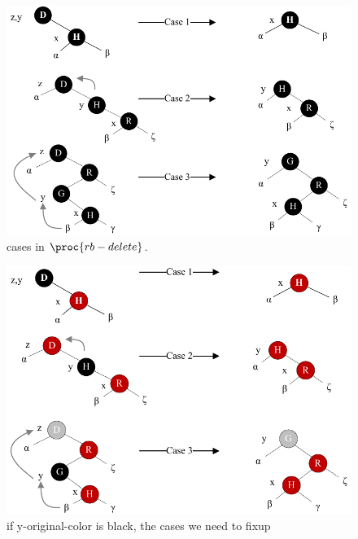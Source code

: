 \documentclass[UTF8,11pt,openany]{ctexbook}
\begin{document}
\begin{figure}[h] %
	\centering %
	\includegraphics[width=1\textwidth]{vector/red-black-tree/delete/delete_cases.pdf} %
	\caption{ cases in $ \proc{rb-delete}  $.  } %
	\label{red_black_delete_cases} %
\end{figure}%

\newpage

\begin{figure}[h] %
	\centering %
	\includegraphics[width=1\textwidth]{vector/red-black-tree/delete/delete_cases2.pdf} %
	\caption{if y-original-color is black, the cases we need to fixup} %
	\label{red_black_delete_cases} %
\end{figure}%
\end{document}
